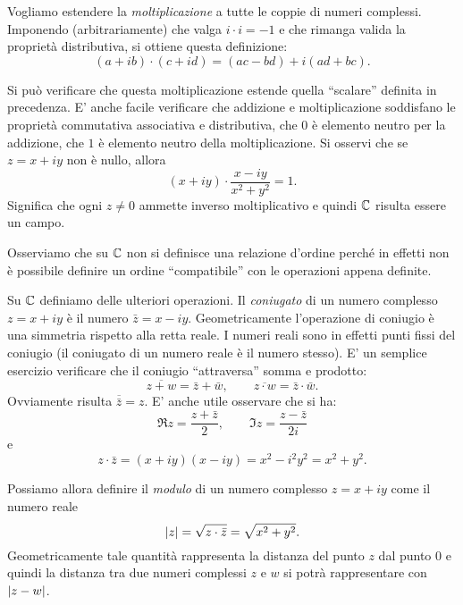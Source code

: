 Vogliamo estendere la \emph{moltiplicazione}%
%
 a tutte le coppie di numeri complessi.
Imponendo (arbitrariamente) che valga $i\cdot i = -1$ e che rimanga
valida la proprietà distributiva, si ottiene
questa definizione:
\[
   (a+ib) \cdot (c+id) = (ac-bd) + i(ad+bc).
\]

Si può verificare che questa moltiplicazione estende quella ``scalare'' definita
in precedenza.
E' anche facile verificare che addizione e moltiplicazione soddisfano
le proprietà commutativa associativa e distributiva,
che $0$ è elemento neutro per la addizione, che $1$ è elemento neutro
della moltiplicazione.
Si osservi che se $z=x+iy$ non è nullo, allora
\[
  (x+iy) \cdot \frac{x-iy}{x^2+y^2} = 1.
\]
Significa che ogni $z\neq 0$ ammette inverso moltiplicativo e quindi ${\mathbb C}$
risulta essere un campo.

Osserviamo che su ${\mathbb C}$ non si definisce una relazione d'ordine perché
in effetti non è possibile definire un ordine ``compatibile'' con le operazioni
appena definite.%

Su ${\mathbb C}$ definiamo delle ulteriori operazioni.
Il \emph{coniugato}%
%
%
di un numero complesso $z=x+iy$ è il numero
$\bar z = x - iy$. Geometricamente l'operazione di coniugio è una simmetria
rispetto alla retta reale. I numeri reali sono in effetti punti fissi del
coniugio (il coniugato di un numero reale è il numero stesso).
E' un semplice esercizio verificare che il coniugio ``attraversa''
somma e prodotto:
\[
\overline{z+w} = \bar z + \bar w, \qquad
\overline{z\cdot w} = \bar z \cdot \bar w.
\]
Ovviamente risulta $\overline {\bar z} = z$.
E' anche utile osservare che si ha:
\begin{equation}\label{eq:re_im}
  \Re z = \frac{z+\bar z}{2}, \qquad
  \Im z = \frac{z-\bar z}{2i}
\end{equation}
e
\[
z \cdot \bar z = (x+iy)(x-iy) = x^2-i^2y^2 = x^2+y^2.
\]

Possiamo allora definire il
\emph{modulo}%
%
%
 di un numero complesso $z=x+iy$
come il numero reale
\[
{\left|z\right|} = \sqrt{z\cdot\bar z} = \sqrt{x^2+y^2}.
\]
Geometricamente tale quantità rappresenta la distanza del punto $z$
dal punto $0$ e quindi la distanza tra due numeri complessi $z$ e
$w$ si potrà rappresentare con ${\left|z-w\right|}$.

